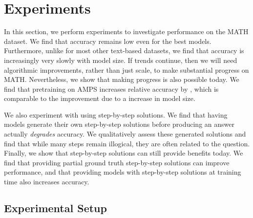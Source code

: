\documentclass{article}
\begin{document}
 
\section{Experiments}


In this section, we perform experiments to investigate performance on the MATH dataset. 
We find that accuracy remains low even for the best models. Furthermore, unlike for most other text-based datasets, we find that accuracy is increasingly very slowly with model size. If trends continue, then we will need algorithmic improvements, rather than just scale, to make substantial progress on MATH. Nevertheless, we show that making progress is also possible today. We find that pretraining on AMPS increases relative accuracy by , which is comparable to the improvement due to a  increase in model size.

We also experiment with using step-by-step solutions. We find that having models generate their own step-by-step solutions before producing an answer actually \emph{degrades} accuracy. We qualitatively assess these generated solutions and find that while many steps remain illogical, they are often related to the question. Finally, we show that step-by-step solutions can still provide benefits today. We find that providing partial ground truth step-by-step solutions can improve performance, and that providing models with step-by-step solutions at training time also increases accuracy.

\subsection{Experimental Setup} 
\end{document}

